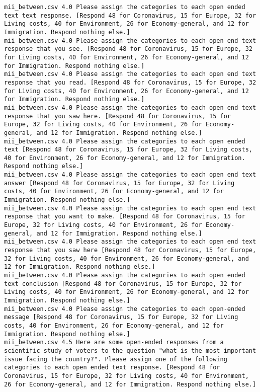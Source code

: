 \begin{lstlisting}[label=lst:promptvariants]
mii_between.csv	4.0	Please assign the categories to each open ended text text response. [Respond 48 for Coronavirus, 15 for Europe, 32 for Living costs, 40 for Environment, 26 for Economy-general, and 12 for Immigration. Respond nothing else.]
mii_between.csv	4.0	Please assign the categories to each open end text response that you see. [Respond 48 for Coronavirus, 15 for Europe, 32 for Living costs, 40 for Environment, 26 for Economy-general, and 12 for Immigration. Respond nothing else.]
mii_between.csv	4.0	Please assign the categories to each open end text response that you read. [Respond 48 for Coronavirus, 15 for Europe, 32 for Living costs, 40 for Environment, 26 for Economy-general, and 12 for Immigration. Respond nothing else.]
mii_between.csv	4.0	Please assign the categories to each open end text response that you saw here. [Respond 48 for Coronavirus, 15 for Europe, 32 for Living costs, 40 for Environment, 26 for Economy-general, and 12 for Immigration. Respond nothing else.]
mii_between.csv	4.0	Please assign the categories to each open ended text [Respond 48 for Coronavirus, 15 for Europe, 32 for Living costs, 40 for Environment, 26 for Economy-general, and 12 for Immigration. Respond nothing else.]
mii_between.csv	4.0	Please assign the categories to each open end text answer [Respond 48 for Coronavirus, 15 for Europe, 32 for Living costs, 40 for Environment, 26 for Economy-general, and 12 for Immigration. Respond nothing else.]
mii_between.csv	4.0	Please assign the categories to each open end text response that you want to make. [Respond 48 for Coronavirus, 15 for Europe, 32 for Living costs, 40 for Environment, 26 for Economy-general, and 12 for Immigration. Respond nothing else.]
mii_between.csv	4.0	Please assign the categories to each open end text response that you saw here [Respond 48 for Coronavirus, 15 for Europe, 32 for Living costs, 40 for Environment, 26 for Economy-general, and 12 for Immigration. Respond nothing else.]
mii_between.csv	4.0	Please assign the categories to each open ended text conclusion [Respond 48 for Coronavirus, 15 for Europe, 32 for Living costs, 40 for Environment, 26 for Economy-general, and 12 for Immigration. Respond nothing else.]
mii_between.csv	4.0	Please assign the categories to each open-ended message [Respond 48 for Coronavirus, 15 for Europe, 32 for Living costs, 40 for Environment, 26 for Economy-general, and 12 for Immigration. Respond nothing else.]
mii_between.csv	4.5	Here are some open-ended responses from a scientific study of voters to the question "what is the most important issue facing the country?". Please assign one of the following categories to each open ended text response. [Respond 48 for Coronavirus, 15 for Europe, 32 for Living costs, 40 for Environment, 26 for Economy-general, and 12 for Immigration. Respond nothing else.]

\end{lstlisting}
